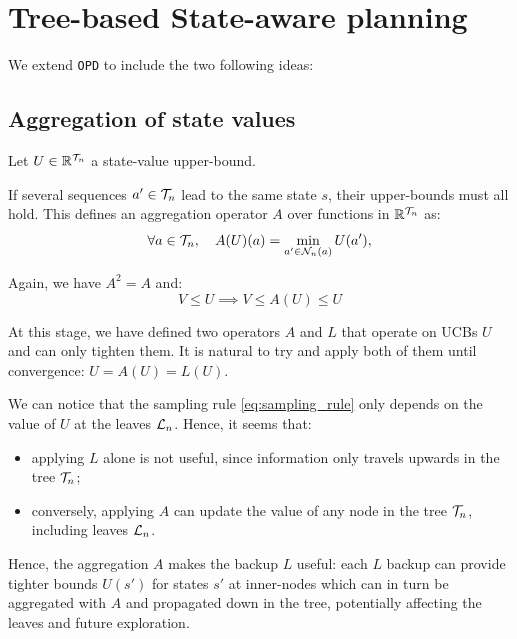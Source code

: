 \documentclass{article}
\begin{document}
\section{Tree-based State-aware planning}

We extend \texttt{OPD} to include the two following ideas:

\subsection{Aggregation of state values}
\label{sec:aggregation}

Let $U\in\mathbb{R}^{\mathcal{T}_n}$ a state-value upper-bound.

\begin{definition}
If several sequences $a'\in\mathcal{T}_n$ lead to the same state $s$, their upper-bounds must all hold. This defines an aggregation operator $A$ over functions in $\mathbb{R}^{\mathcal{T}_n}$ as:
    \begin{equation}
    \label{eq:aggregation}
        \forall a\in\mathcal{T}_n, \quad A(U)(a) = \min_{a'\in \mathcal{N}_n(a)} U(a'),
    \end{equation}
    
Again, we have $A^2=A$ and:
\begin{equation*}
    V \leq U \implies V \leq A(U) \leq U
\end{equation*}
\end{definition}

At this stage, we have defined two operators $A$ and $L$ that operate on UCBs $U$ and can only tighten them. It is natural to try and apply both of them until convergence: $U = A(U) = L(U)$.


\begin{remark}
We can notice that the sampling rule \eqref{eq:sampling_rule} only depends on the value of $U$ at the leaves $\mathcal{L}_n$. Hence, it seems that:
\begin{itemize}
    \item applying $L$ alone is not useful, since information only travels upwards in the tree $\mathcal{T}_n$;
    \item conversely, applying $A$ can update the value of any node in the tree $\mathcal{T}_n$, including leaves $\mathcal{L}_n$.
\end{itemize}
Hence, the aggregation $A$ makes the backup $L$ useful: each $L$ backup can provide tighter bounds $U(s')$ for states $s'$ at inner-nodes which can in turn be aggregated with $A$ and propagated down in the tree, potentially affecting the leaves and future exploration. 
\end{remark}
\end{document}
